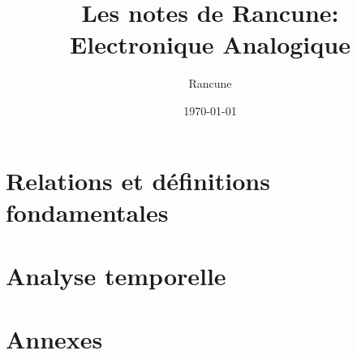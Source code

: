 \documentclass[a4paper,12pt]{book}
\title{Les notes de Rancune: \\Electronique Analogique}
\author{Rancune}
\date{\today}
\begin{document}
\maketitle

\frontmatter

\tableofcontents    

\mainmatter



\part{ Relations et définitions fondamentales }






\part{ Analyse temporelle }



%
%
%


\part{Annexes}
\appendix



\backmatter

\cleardoublepage
{}
\printindex

\end{document}

